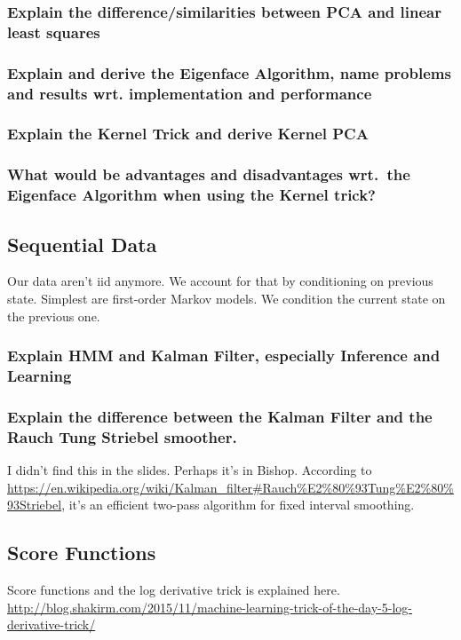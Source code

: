 \documentclass{article}
\begin{document}
\subsubsection{Explain the difference/similarities between PCA and linear least squares}

\subsubsection{Explain and derive the Eigenface Algorithm, name problems and results wrt. implementation and performance}

\subsubsection{Explain the Kernel Trick and derive Kernel PCA}

\subsubsection{What would be advantages and disadvantages wrt.~the Eigenface Algorithm when using the Kernel trick?}







\subsection{Sequential Data}
Our data aren't iid anymore. We account for that by conditioning on previous state. Simplest are first-order Markov models. We condition the current state on the previous one. 

\subsubsection{Explain HMM and Kalman Filter, especially Inference and Learning}

\subsubsection{Explain the difference between the Kalman Filter and the Rauch Tung Striebel smoother.}
I didn't find this in the slides. Perhaps it's in Bishop. According to  \url{https://en.wikipedia.org/wiki/Kalman_filter#Rauch\%E2\%80\%93Tung\%E2\%80\%93Striebel}, it's an efficient two-pass algorithm for fixed interval smoothing.


\subsection{Score Functions}
Score functions and the log derivative trick is explained here.
\url{http://blog.shakirm.com/2015/11/machine-learning-trick-of-the-day-5-log-derivative-trick/}
\end{document}
